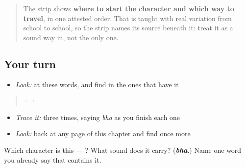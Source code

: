 \begin{quote}
The strip shows \textbf{where to start the character and which way to travel}, in one attested order. That is taught with real variation from school to school, so the strip names its source beneath it: treat it as a sound way in, not the only one.
\end{quote}

\subsection*{Your turn}
\begin{itemize}
\raggedright
  \item \emph{Look:} at these words, and find  in the ones that have it
\end{itemize}

\begin{quote}
  ·    ·  
\end{quote}

\begin{itemize}
\raggedright
  \item \emph{Trace it:}  three times, saying \emph{bha} as you finish each one
  \item \emph{Look:} back at any page of this chapter and find  once more
\end{itemize}

\begin{tcolorbox}[breakable,colback=teal!4,colframe=teal!35!black,title={Before you move on}]
Which character is this — ? What sound does it carry? (\emph{\textbf{bha}}.) Name one word you already say that contains it.
\end{tcolorbox}
